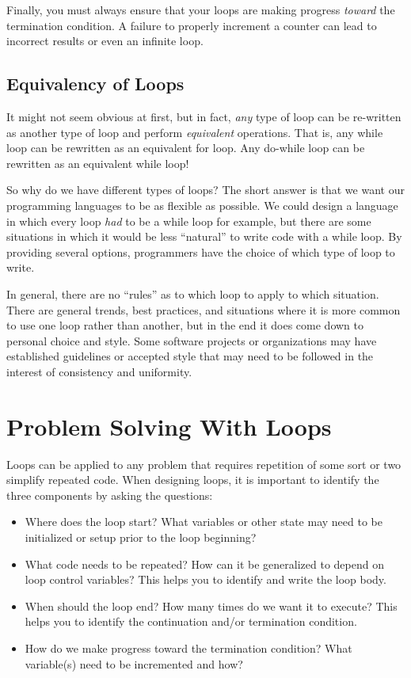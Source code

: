 Finally, you must always ensure that your loops are making progress
\emph{toward} the termination condition.  A failure to properly 
increment a counter can lead to incorrect results or even an infinite
loop.

\subsection{Equivalency of Loops}

It might not seem obvious at first, but in fact, \emph{any} type of loop can be re-written 
as another type of loop and perform \emph{equivalent} operations.  That is, any while loop
can be rewritten as an equivalent for loop.  Any do-while loop can be rewritten as an 
equivalent while loop!  

So why do we have different types of loops?  The short answer is that we want our programming
languages to be as flexible as possible.  We could design a language in which every loop
\emph{had} to be a while loop for example, but there are some situations in which it would be 
less ``natural'' to write code with a while loop.  By providing several options, programmers have
the choice of which type of loop to write.  

In general, there are no ``rules'' as to which loop to apply to which situation.  There are general
trends, best practices, and situations where it is more common to use one loop rather than another,
but in the end it does come down to personal choice and style.  Some software projects or
organizations may have established guidelines or accepted style that may need to be followed
in the interest of consistency and uniformity.  

\section{Problem Solving With Loops}

Loops can be applied to any problem that requires repetition of some sort or two simplify
repeated code.  When designing loops, it is important to identify the three components by asking
the questions:
\begin{itemize}
  \item Where does the loop start?  What variables or other state may need to be initialized or setup
  	prior to the loop beginning?
  \item What code needs to be repeated?  How can it be generalized to depend on loop control variables?
  	This helps you to identify and write the loop body.
  \item When should the loop end?  How many times do we want it to execute?  This helps you to 
  	identify the continuation and/or termination condition.
  \item How do we make progress toward the termination condition?  What variable(s) need to be incremented
  	and how?
\end{itemize}

